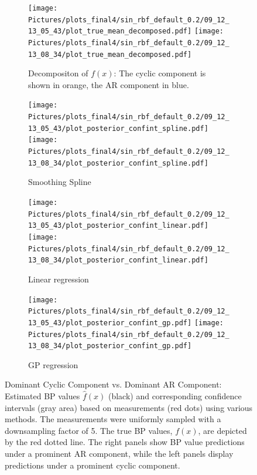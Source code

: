 \begin{figure}
\begin{subfigure}{\textwidth}
    \centering
    \texttt{[image: 
        Pictures/plots\_final4/sin\_rbf\_default\_0.2/09\_12\_13\_05\_43/plot\_true\_mean\_decomposed.pdf]}
    \texttt{[image: 
        Pictures/plots\_final4/sin\_rbf\_default\_0.2/09\_12\_13\_08\_34/plot\_true\_mean\_decomposed.pdf]}
  \caption{Decompositon of $f(x)$: The cyclic component is shown in orange, the AR component in blue.}
\end{subfigure}

\begin{subfigure}{\textwidth}
    \centering
    \texttt{[image: 
        Pictures/plots\_final4/sin\_rbf\_default\_0.2/09\_12\_13\_05\_43/plot\_posterior\_confint\_spline.pdf]}
    \texttt{[image: 
        Pictures/plots\_final4/sin\_rbf\_default\_0.2/09\_12\_13\_08\_34/plot\_posterior\_confint\_spline.pdf]}
  \caption{Smoothing Spline}
\end{subfigure}

\begin{subfigure}{\textwidth}
    \centering
    \texttt{[image: 
        Pictures/plots\_final4/sin\_rbf\_default\_0.2/09\_12\_13\_05\_43/plot\_posterior\_confint\_linear.pdf]}
    \texttt{[image: 
        Pictures/plots\_final4/sin\_rbf\_default\_0.2/09\_12\_13\_08\_34/plot\_posterior\_confint\_linear.pdf]}
  \caption{Linear regression }
\end{subfigure}

\begin{subfigure}{\textwidth}
    \centering
    \texttt{[image: 
        Pictures/plots\_final4/sin\_rbf\_default\_0.2/09\_12\_13\_05\_43/plot\_posterior\_confint\_gp.pdf]}
    \texttt{[image: 
        Pictures/plots\_final4/sin\_rbf\_default\_0.2/09\_12\_13\_08\_34/plot\_posterior\_confint\_gp.pdf]}
  \caption{GP regression}
\end{subfigure}\hfill

\caption[Dominant Cyclic Component vs. Dominant AR Component]{
Dominant Cyclic Component vs. Dominant AR Component:
    Estimated BP values $\hat{f}(x)$ (black) and corresponding confidence intervals (gray area)
    based on measurements (red dots) using various methods.
    The measurements were uniformly sampled with a downsampling factor of 5.
    The true BP values, $f(x)$, are depicted by the red dotted line.
    The right panels show BP value predictions under a prominent AR component,
    while the left panels display predictions under a prominent cyclic component.
 }
\label{fig:ex-ar-cyclic}
\end{figure}

